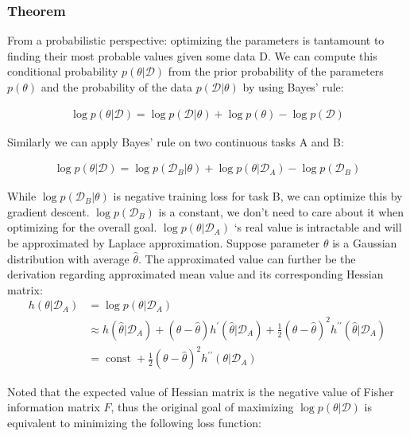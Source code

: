 \subsubsection{Theorem}
From a probabilistic perspective: optimizing the parameters is tantamount to finding their most probable values given some data D. We can compute this conditional probability $p(\theta | \mathcal{D})$ from the prior probability of the parameters $p(\theta)$ and the probability of the data $p(\mathcal{D}|\theta)$ by using Bayes’ rule:

\begin{equation}
\begin{aligned}
\log p(\theta | \mathcal{D})=\log p(\mathcal{D} | \theta)+\log p(\theta)-\log p(\mathcal{D})
\end{aligned}
\end{equation}

Similarly we can apply Bayes' rule on two continuous tasks A and B: 

\begin{equation}
\begin{aligned}
\log p(\theta | \mathcal{D})=\log p\left(\mathcal{D}_{B} | \theta\right)+\log p\left(\theta | \mathcal{D}_{A}\right)-\log p\left(\mathcal{D}_{B}\right)
\end{aligned}
\end{equation}

While $\log p(\mathcal{D}_{B}|\theta)$ is negative training loss for task B, we can optimize this by gradient descent.
$\log p(\mathcal{D}_{B})$ is a constant, we don't need to care about it when optimizing for the overall goal. $\log p(\theta|\mathcal{D}_{A})$ ‘s real value is intractable and will be approximated by Laplace approximation. Suppose parameter $\theta$ is a Gaussian distribution with average $\hat{\theta}$. The approximated value can further be the derivation regarding approximated mean value and its corresponding Hessian matrix: 
\begin{align*}
   h(\theta| \mathcal{D}_{A}) &=  \log p(\theta| \mathcal{D}_{A})\\
 & \approx h(\hat{\theta}| \mathcal{D}_{A})+(\theta-\hat{\theta}) h^{\prime}(\hat{\theta}| \mathcal{D}_{A})+\frac{1}{2}(\theta-\hat{\theta})^{2} h^{\prime \prime}(\hat{\theta}| \mathcal{D}_{A})\\
 &= \operatorname{const}+\frac{1}{2}(\theta-\hat{\theta})^{2} h^{\prime \prime}(\theta| \mathcal{D}_{A})
\end{align*}

Noted that the expected value of Hessian matrix is the negative value of Fisher information matrix $F$, thus the original goal of maximizing $\log p(\theta | \mathcal{D})$ is equivalent to minimizing the following loss function:



